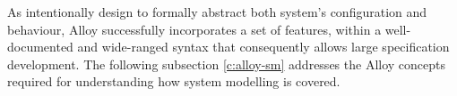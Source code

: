 As intentionally design to formally abstract both system's configuration and behaviour, Alloy successfully incorporates a set of features, within a well-documented and wide-ranged syntax that consequently allows large specification development. \cite{carvalho2020analysis} The following subsection \ref{c:alloy-sm} addresses the Alloy concepts required for understanding how system modelling is covered. 

% 
% 
% 

% 
% 


